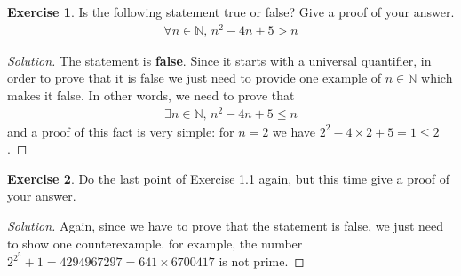 \documentclass[a4paper,oneside]{article}
\theoremstyle{definition} \newtheorem{exercise}{Exercise}[section]
\begin{document}
\begin{exercise}
  Is the following statement true or false? Give a proof of your answer.
  \begin{align*}
    \forall n\in \mathbb N,\, n^2 -4n +5>n
  \end{align*}
\end{exercise}
\begin{proof}[Solution]
  The statement is \textbf{false}. Since it starts with a universal
  quantifier, in order to prove that it is false we just need to provide one
  example of $n\in \mathbb N$ which makes it false. In other words, we need to
  prove that
  \begin{align*}
    \exists n\in \mathbb N,\, n^2-4n+5\leq n
  \end{align*}
  and a proof of this fact is very simple: for $n=2$ we have
  $2^2-4\times 2+5=1\leq 2$.
\end{proof}

\begin{exercise}
  Do the last point of Exercise 1.1 again, but this time give a proof of your
  answer.
\end{exercise}
\begin{proof}[Solution]
  Again, since we have to prove that the statement is false, we just need to
  show one counterexample. for example, the number
  $2^{2^5}+1=4294967297=641\times 6700417$ is not prime.
\end{proof}
\end{document}
